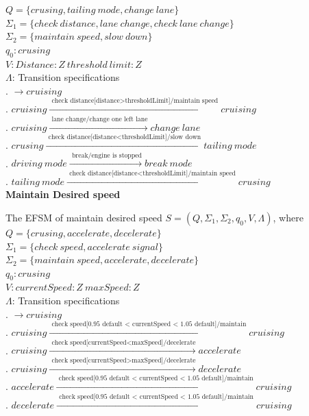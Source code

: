 \documentclass[12pt]{article}
\begin{document}
\begin{spacing}{1.5}
\noindent $Q = \{crusing,tailing~mode,change~lane\}$\\
\noindent $\Sigma_1 = \{check~distance,lane~change,check~lane~change\}$\\
\noindent $\Sigma_2 = \{maintain~speed,slow~down\}$\\
\noindent $q_0: crusing$\\
\noindent $V: Distance:Z~threshold~limit:Z$\\
\noindent $\Lambda$: Transition specifications\\
. $\rightarrow cruising$\\
. $cruising \xrightarrow {\text { check~distance[distance>thresholdLimit]/maintain~speed}} cruising$\\
. $cruising \xrightarrow {\text { lane~change/change~one~left~lane}} change~lane$\\
. $crusing \xrightarrow {\text { check~distance[distance<thresholdLimit]/slow~down}} tailing~mode$\\
. $driving~mode \xrightarrow {\text { break/engine~is~stopped}} break~mode$\\
. $tailing~mode \xrightarrow {\text { check~distance[distance<thresholdLimit]/maintain~speed}} crusing$\\

\newpage
\noindent \textbf{Maintain Desired speed}

\noindent The EFSM of maintain desired speed $S = (Q, \Sigma_1, \Sigma_2, q_0, V, \Lambda)$, where\\

\noindent $Q = \{crusing,accelerate,decelerate\}$\\
\noindent $\Sigma_1 = \{check~speed,accelerate~signal\}$\\
\noindent $\Sigma_2 = \{maintain~speed,accelerate,decelerate\}$\\
\noindent $q_0: crusing$\\
\noindent $V: currentSpeed:Z~maxSpeed:Z$\\
\noindent $\Lambda$: Transition specifications\\
. $\rightarrow cruising$\\
. $cruising \xrightarrow {\text { check~speed[0.95 default < currentSpeed < 1.05 default]/maintain}} cruising$\\
. $cruising \xrightarrow {\text { check~speed[currentSpeed<maxSpeed]/decelerate}} accelerate$\\
. $cruising \xrightarrow {\text { check~speed[currentSpeed>maxSpeed]/decelerate}} decelerate$\\
. $accelerate \xrightarrow {\text { check~speed[0.95 default < currentSpeed < 1.05 default]/maintain}} cruising$\\
. $decelerate \xrightarrow {\text { check~speed[0.95 default < currentSpeed < 1.05 default]/maintain}} cruising$\\


\end{spacing}
\end{document}
